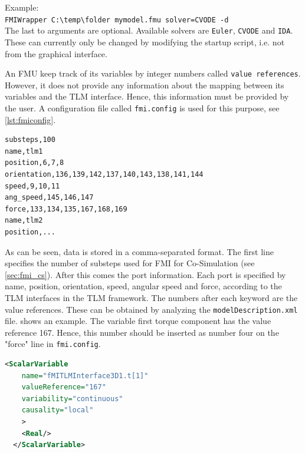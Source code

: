 \documentclass[11pt,a4paper]{report}
\begin{document}
Example:\\

\noindent \verb|FMIWrapper C:\temp\folder mymodel.fmu solver=CVODE -d|\\

The last to arguments are optional.
Available solvers are \texttt{Euler}, \texttt{CVODE} and \texttt{IDA}.
These can currently only be changed by modifying the startup script, i.e. not from the graphical interface.

An FMU keep track of its variables by integer numbers called \texttt{value references}.
However, it does not provide any information about the mapping between its variables and the TLM interface.
Hence, this information must be provided by the user.
A configuration file called \texttt{fmi.config} is used for this purpose, see \cref{lst:fmiconfig}.

\begin{lstlisting}[basicstyle=\ttfamily,floatplacement=ht,caption=A configuration file maps value references to TLM variables,label=lst:fmiconfig]
substeps,100
name,tlm1
position,6,7,8
orientation,136,139,142,137,140,143,138,141,144
speed,9,10,11
ang_speed,145,146,147
force,133,134,135,167,168,169
name,tlm2
position,...
\end{lstlisting}

As can be seen, data is stored in a comma-separated format.
The first line specifies the number of substeps used for FMI for Co-Simulation (see \cref{sec:fmi_cs}).
After this comes the port information.
Each port is specified by name, position, orientation, speed, angular speed and force, according to the TLM interfaces in the TLM framework.
The numbers after each keyword are the value references.
These can be obtained by analyzing the \texttt{modelDescription.xml} file.
 shows an example.
The variable first torque component has the value reference 167.
Hence, this number should be inserted as number four on the "force" line in \texttt{fmi.config}.

\begin{lstlisting}[language=XML,floatplacement=ht,caption=Value references for variables are obtained from \texttt{modelDescription.xml},label=lst:modeldescription]
  <ScalarVariable
    name="fMITLMInterface3D1.t[1]"
    valueReference="167"
    variability="continuous"
    causality="local"
    >
    <Real/>
  </ScalarVariable>
\end{lstlisting}
\end{document}

